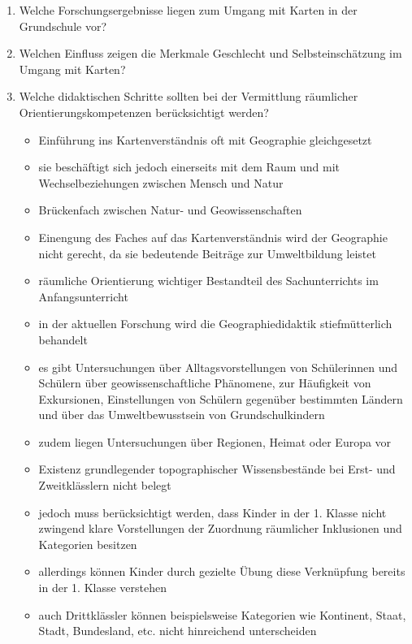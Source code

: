 \begin{enumerate}
	\item{Welche Forschungsergebnisse liegen zum Umgang mit Karten in der Grundschule vor?}
	\item{Welchen Einfluss zeigen die Merkmale \glqq Geschlecht\grqq{} und \glqq Selbsteinschätzung\grqq{} im Umgang mit Karten?}
	\item{
		Welche didaktischen Schritte sollten bei der Vermittlung räumlicher Orientierungskompetenzen berücksichtigt werden?
		\begin{itemize}
			\item{Einführung ins Kartenverständnis oft mit Geographie gleichgesetzt}
			\item{sie beschäftigt sich jedoch einerseits mit dem Raum und mit Wechselbeziehungen zwischen Mensch und Natur}
			\item{Brückenfach zwischen Natur- und Geowissenschaften}
			\item{Einengung des Faches auf das Kartenverständnis wird der Geographie nicht gerecht, da sie bedeutende Beiträge zur Umweltbildung leistet}
			\item{räumliche Orientierung wichtiger Bestandteil des Sachunterrichts im Anfangsunterricht}
			\item{in der aktuellen Forschung wird die Geographiedidaktik stiefmütterlich behandelt}
			\item{es gibt Untersuchungen über Alltagsvorstellungen von Schülerinnen und Schülern über geowissenschaftliche Phänomene, zur Häufigkeit von Exkursionen, Einstellungen von Schülern gegenüber bestimmten Ländern und über das Umweltbewusstsein von Grundschulkindern}
			\item{zudem liegen Untersuchungen über Regionen, Heimat oder Europa vor}
			\item{Existenz grundlegender topographischer Wissensbestände bei Erst- und Zweitklässlern nicht belegt}
			\item{jedoch muss berücksichtigt werden, dass Kinder in der 1. Klasse nicht zwingend klare Vorstellungen der Zuordnung räumlicher Inklusionen und Kategorien besitzen}
			\item{allerdings können Kinder durch gezielte Übung diese Verknüpfung bereits in der 1. Klasse verstehen}
			\item{auch Drittklässler können beispielsweise Kategorien wie Kontinent, Staat, Stadt, Bundesland, etc. nicht hinreichend unterscheiden}

\end{itemize}}
\end{enumerate}
